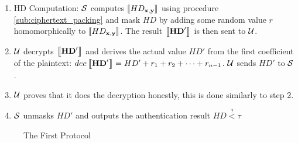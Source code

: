 \begin{description}
\begin{enumerate}
\item HD Computation: $\mathcal{S}$ computes $\left\llbracket HD_{\mathbf{x,y}}\right\rrbracket$ using
  procedure \ref{sub:ciphertext_packing} and mask $HD$ by adding some random
  value $r$ homomorphically to $\left\llbracket HD_{\mathbf{x,y}}\right\rrbracket$. The result
  $\left\llbracket\mathbf{HD}'\right\rrbracket$ is then sent to $\mathcal{U}$.
\item \(\mathcal{U}\) decrypts $\left\llbracket\mathbf{HD}'\right\rrbracket$ and derives the actual value
  ${HD'}$ from the first coefficient of the plaintext:
  \( dec\left\llbracket\mathbf{HD}'\right\rrbracket = HD' + r_1 + r_2 + \dots + r_{n-1} \). \(\mathcal{U}\)
  sends \(HD'\) to \(\mathcal{S}\).
\item \(\mathcal{U}\) proves that it does the decryption honestly, this is done
  similarly to step 2.
\item \(\mathcal{S}\) unmasks \(HD'\) and outputs the authentication result
  \(HD \stackrel{?}{<} \tau\)
  \end{enumerate}

\end{description}

\begin{figure}[htbp!] 
  \centering {}
  \caption{The First Protocol}
  \label{fig:firstProtocol}
\end{figure}

